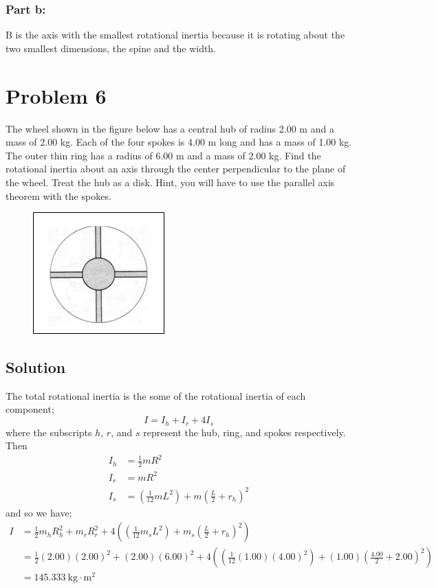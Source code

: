 \documentclass{article}
\begin{document}
\subsubsection*{Part b:}
B is the axis with the smallest rotational inertia because it is rotating about the two smallest dimensions, the spine and the width.

\section*{Problem 6}
The wheel shown in the figure below has a central hub of radius 2.00 m and a mass of 2.00
kg. Each of the four spokes is 4.00 m long and has a mass of 1.00 kg. The outer thin ring has a
radius of 6.00 m and a mass of 2.00 kg. Find the rotational inertia about an axis through the
center perpendicular to the plane of the wheel. Treat the hub as a disk. Hint, you will have to
use the parallel axis theorem with the spokes.

\begin{figure}[ht]
    \centering
    \includegraphics[scale=0.5]{drawing-4.png}
\end{figure}

\subsection*{Solution}
The total rotational inertia is the some of the rotational inertia of each component;
\[
	I = I_h + I_r + 4I_s
\]
where the subscripts $h$, $r$, and $s$ represent the hub, ring, and spokes respectively. Then
\begin{align*}
	I_h &= \frac{1}{2}mR^2 \\
	I_r &= mR^2 \\
	I_s &= \left(\frac{1}{12}mL^2\right) + m\left(\frac{L}{2}+r_h\right)^2
\end{align*}
and so we have;
\begin{align*}
	I &= \frac{1}{2}m_h R_h^2 + m_r R_r^2 + 4\left(\left(\frac{1}{12}m_s L^2\right) + m_s\left(\frac{L}{2}+r_h\right)^2\right) \\
	  &= \frac{1}{2}(2.00)(2.00)^2 + (2.00)(6.00)^2 + 4\left(\left(\frac{1}{12}(1.00)(4.00)^2\right) + (1.00)\left(\frac{4.00}{2}+2.00\right)^2\right)\\
	  &= \boxed{145.333\ \text{kg} \cdot \text{m}^2}
\end{align*}
\end{document}
